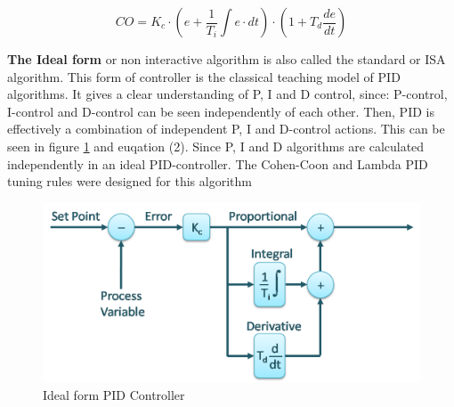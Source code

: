 \begin{equation}
	\label{eqn:1}
	CO = K_c\cdot\left(e + \frac{1}{T_i}\int e\cdot dt \right)\cdot \left(1 + T_d\frac{de}{dt} \right)
\end{equation}




\textbf{The Ideal form} or non interactive algorithm is also called the standard or ISA algorithm. This form of controller is the classical teaching model of PID algorithms. It gives a clear understanding of P, I and D control, since: P-control, I-control and D-control can be seen independently of each other. Then, PID is effectively a combination of independent P, I and D-control actions. This can be seen in figure \ref{figure: Ideal PID} and euqation (2).
Since P, I and D algorithms are calculated independently in an ideal PID-controller. The Cohen-Coon and Lambda PID tuning rules were designed for this algorithm

\begin{figure}[H]
	\centering
	\includegraphics[width=0.8\columnwidth]{Pictures/ideal.png}
	\caption[Short title]{Ideal form PID Controller \cite{PID}}
	\label{figure: Ideal PID}
\end{figure}

